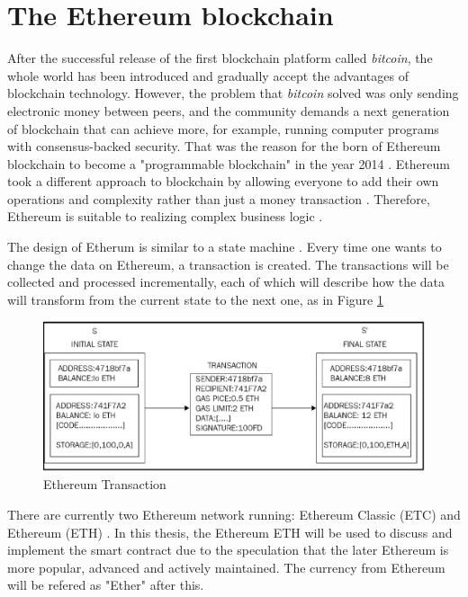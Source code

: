 \documentclass[twoside,draftfooter]{tutthesis} %
\begin{document}
\section{The Ethereum blockchain}

After the successful release of the first blockchain platform called \textit{bitcoin}, the whole world has been introduced and gradually accept the advantages of blockchain technology. However, the problem that \textit{bitcoin} solved was only sending electronic money between peers, and the community demands a next generation of blockchain that can achieve more, for example, running computer programs with consensus-backed security. That was the reason for the born of Ethereum blockchain to become a "programmable blockchain" in the year 2014 \citep{Ethdocorg:WhatIsEthereum}. Ethereum took a different approach to blockchain by allowing everyone to add their own operations and complexity rather than just a money transaction \citep{RefWorks:doc:MasteringBlockchain}. Therefore, Ethereum is suitable to realizing complex business logic \citep{RefWorks:doc:EthereumStateOfKnowledge}.

The design of Etherum is similar to a state machine \citep{RefWorks:doc:EthereumStateOfKnowledge}\citep{RefWorks:doc:MasteringBlockchain}\citep{RefWorks:doc:EthereumASecureDecentralizedTransaction}. Every time one wants to change the data on Ethereum, a transaction is created. The transactions will be collected and processed incrementally, each of which will describe how the data will transform from the current state to the next one, as in Figure \ref{fig:ethereum_transaction}

\begin{figure}
    \centering
    \includegraphics[width=\linewidth]{ethereum_transaction.jpg}
    \caption{Ethereum Transaction \citep{RefWorks:doc:MasteringBlockchain}}
    \label{fig:ethereum_transaction}
\end{figure}

There are currently two Ethereum network running: Ethereum Classic (ETC) \citep{EthereumClassic} and Ethereum (ETH) \citep{Ethereum}. In this thesis, the Ethereum ETH will be used to discuss and implement the smart contract due to the speculation that the later Ethereum is more popular, advanced and actively maintained. The currency from Ethereum will be refered as "Ether" after this.
\end{document}
